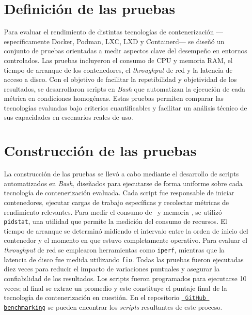 \section{Definición de las pruebas}
\noindent
Para evaluar el rendimiento de distintas tecnologías de contenerización —específicamente Docker, Podman, LXC, LXD y Containerd— se diseñó un conjunto de pruebas orientadas a medir aspectos clave del desempeño en entornos controlados. Las pruebas incluyeron el consumo de CPU y memoria RAM, el tiempo de arranque de los contenedores, el \textit{throughput} de red y la latencia de acceso a disco. 
Con el objetivo de facilitar la repetibilidad y objetividad de los resultados, se desarrollaron scripts en \textit{Bash} que automatizan la ejecución de cada métrica en condiciones homogéneas. Estas pruebas permiten comparar las tecnologías evaluadas bajo criterios cuantificables y facilitar un análisis técnico de sus capacidades en escenarios reales de uso.

\section{Construcción de las pruebas}
\noindent
La construcción de las pruebas se llevó a cabo mediante el desarrollo de scripts automatizados en \textit{Bash}, diseñados para ejecutarse de forma uniforme sobre cada tecnología de contenerización evaluada. Cada script fue responsable de iniciar contenedores, ejecutar cargas de trabajo específicas y recolectar métricas de rendimiento relevantes.
Para medir el consumo de \CPU\ y memoria \RAM, se utilizó \texttt{pidstat}, una utilidad que permite la medición del consumo de recursos. El tiempo de arranque se determinó midiendo el intervalo entre la orden de inicio del contenedor y el momento en que estuvo completamente operativo. 
Para evaluar el \textit{throughput} de red se emplearon herramientas como \texttt{iperf}, mientras que la latencia de disco fue medida utilizando \texttt{fio}. Todas las pruebas fueron ejecutadas diez veces para reducir el impacto de variaciones puntuales y asegurar la confiabilidad de los resultados. Los scripts fueron programados para ejecutarse 10 veces; al final se extrae un promedio y este constituye el puntaje final de la tecnología de contenerización en cuestión.
En el repositorio \underline{\href{https://github.com/Anubis-1001/benchmark-tecnologias-de-contenerizacion} {\texttt{ GitHub benchmarking}}} se pueden encontrar los \textit{scripts} resultantes de este proceso.


